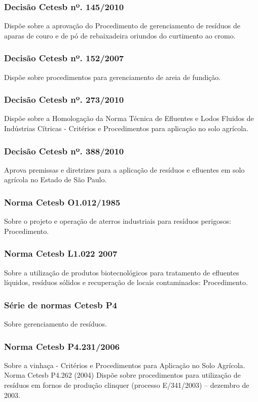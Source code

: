 \begin{subapend}
\begin{subsubapend}
		\subsubsection{Decisão Cetesb nº. 145/2010}
		Dispõe sobre a aprovação do Procedimento de gerenciamento de resíduos de aparas de couro e de pó de rebaixadeira oriundos do curtimento ao cromo.
		\subsubsection{Decisão Cetesb nº. 152/2007}
		Dispõe sobre procedimentos para gerenciamento de areia de fundição.
		\subsubsection{Decisão Cetesb nº. 273/2010}
		Dispõe sobre a Homologação da Norma Técnica de Efluentes e Lodos Fluidos de Indústrias Cítricas - Critérios e Procedimentos para aplicação no solo agrícola.
		\subsubsection{Decisão Cetesb nº. 388/2010}
		Aprova premissas e diretrizes para a aplicação de resíduos e efluentes em solo agrícola no Estado de São Paulo.
		\subsubsection{Norma Cetesb O1.012/1985}
		Sobre o projeto e operação de aterros industriais para resíduos perigosos: Procedimento.
		\subsubsection{Norma Cetesb L1.022 2007}
		Sobre a utilização de produtos biotecnológicos para tratamento de efluentes líquidos, resíduos sólidos e recuperação de locais contaminados: Procedimento.
		\subsubsection{Série de normas Cetesb P4}
		Sobre gerenciamento de resíduos.
		\subsubsection{Norma Cetesb P4.231/2006}
		Sobre a vinhaça - Critérios e Procedimentos para Aplicação no Solo Agrícola. Norma Cetesb P4.262 (2004) Dispõe sobre procedimentos para utilização de resíduos em fornos de produção clinquer (processo E/341/2003) – dezembro de 2003.

\end{subsubapend}
\end{subapend}
